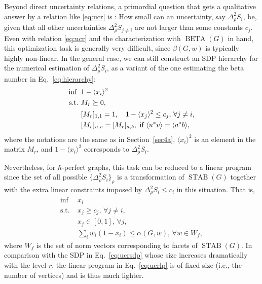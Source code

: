 \documentclass[
12pt,
prx,
aps,
reprint,
a4paper,
longbibliograph,
nofootinbib,
nobibnotes,
superscriptaddress
]{revtex4-2}
\theoremstyle{definition}
\def\stab{\operatorname{STAB}}
\def\be{\operatorname{BETA}}
\begin{document}
Beyond direct uncertainty relations, a primordial question that gets a qualitative answer by a relation like \eqref{eq:ucr} is \cite{schwonnek2018uncertainty}: How small can an uncertainty, say $\Delta^2_\rho S_i$,  be, given that all other uncertainties $\Delta^2_\rho S_{j\neq i}$ are not larger than some constants $c_j$.
Even with relation \eqref{eq:ucr} and the characterization with $\be(G)$ in hand, this optimization task is generally very difficult, since $\beta(G,w)$ is typically highly non-linear.
In the general case, we can still construct an SDP hierarchy for the numerical estimation of $\Delta_\rho^2 S_i$, as a variant of the one estimating the beta number in Eq.~\eqref{eq:hierarchy}:
\begin{equation}\label{eq:ucrsdp}
\begin{aligned}
 \inf\,\,\, &1-\langle x_i\rangle^2\\
\rm{s.t.}\ & M_r\succeq0,\\
&[M_r]_{1,1}=1, \quad 1-\langle x_j\rangle^2 \le c_j, \,\forall j\ne i,\\
&[M_r]_{u,v}=[M_r]_{a,b}, \text{ if }\langle u^*v\rangle=\langle a^*b\rangle,
\end{aligned}
\end{equation}
where the notations are the same as in Section~\ref{sec4a}, $\langle x_i\rangle^2$ is an element in the matrix $M_r$, and $1-\langle x_i\rangle^2$ corresponds to $\Delta^2_\rho S_i$.

Nevertheless, for $\hbar$-perfect graphs, this task can be reduced to a linear program since the set of all possible $\{\Delta^2_\rho S_i\}_\rho$ is a transformation of $\stab(G)$ together with the extra linear constraints imposed by $\Delta^2_\rho S_i \le c_i$ in this situation. That is,
\begin{equation}\label{eq:ucrlp}
\begin{aligned}
	\inf\,\,\, &x_i\\
	\mathrm{s.t.}\ &x_j \ge c_j, \,\forall j\neq i,\\
		    &x_j \in [0,1], \,\forall j,\\
		    &\sum\nolimits_i w_i (1-x_i) \le \alpha(G,w), \,\forall w\in W_f,
\end{aligned}
\end{equation}
where $W_f$ is the set of norm vectors corresponding to facets of $\stab(G)$.
In comparison with the SDP in Eq.~\eqref{eq:ucrsdp} whose size increases dramatically with the level $r$, the linear program in Eq.~\eqref{eq:ucrlp} is of fixed size (i.e., the number of vertices) and is thus much lighter.
\end{document}
